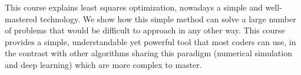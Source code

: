 \documentclass[notitlepage,oneside]{book}
\begin{document}



This course explains least squares optimization, nowadays a simple and well-mastered technology.
We show how this simple method can solve a large number of problems that would be difficult to approach in any other way.
This course provides a simple, understandable yet powerful tool that most coders can use,
in the contrast with other algorithms sharing this paradigm (numerical simulation and deep learning) which are more complex to master.

\vspace{3mm}
\end{document}
